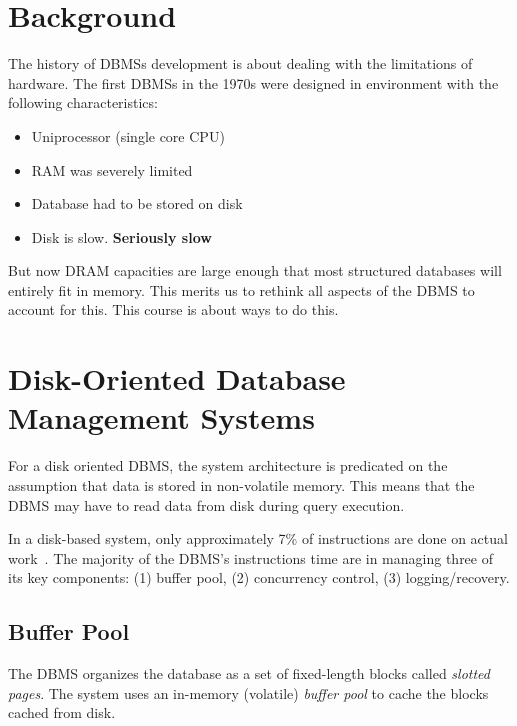 \documentclass[11pt]{article}
\begin{document}
\maketitle
\thispagestyle{plain}

\section{Background}
The history of DBMSs development is about dealing with the limitations of hardware.
The first DBMSs in the 1970s were designed in environment with the following characteristics:
\begin{itemize}
    \item Uniprocessor (single core CPU)
    \item RAM was severely limited
    \item Database had to be stored on disk
    \item Disk is slow. \textbf{Seriously slow}
\end{itemize}
   
But now DRAM capacities are large enough that most structured databases will entirely fit in memory.
This merits us to rethink all aspects of the DBMS to account for this. This course is about ways to 
do this.

\section{Disk-Oriented Database Management Systems}
For a disk oriented DBMS, the system architecture is predicated on the assumption that data 
is stored in non-volatile memory. This means that the DBMS may have to read data from disk during 
query execution.

In a disk-based system, only approximately 7\% of instructions are done on actual 
work~\cite{harizopoulos08}. The majority of the DBMS's instructions time are in managing 
three of its key components: (1) buffer pool, (2) concurrency control, (3) logging/recovery.

\subsection*{Buffer Pool}
The DBMS organizes the database as a set of fixed-length blocks called \textit{slotted pages}.
The system uses an in-memory (volatile) \textit{buffer pool} to cache the blocks cached from disk.
\end{document}
